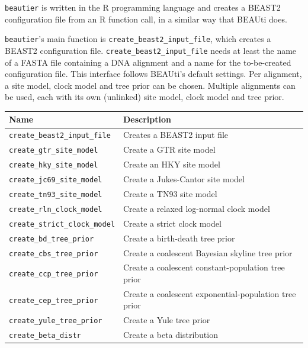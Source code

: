 \documentclass{article}
\begin{document}
\verb;beautier; is written in the R programming language \cite{R}
and creates a BEAST2 configuration file from an R function call,
in a similar way that BEAUti does.

\verb;beautier;'s main function is \verb;create_beast2_input_file;, which creates a BEAST2 configuration file. 
\verb;create_beast2_input_file; needs at least the name of a FASTA file containing a DNA alignment
and a name for the to-be-created configuration file. 
This interface follows BEAUti's default settings.
Per alignment, a site model, clock model and tree prior can be chosen.
Multiple alignments can be used, each with its own (unlinked) site model, clock model and tree prior.

\begin{table}[]
\centering
\begin{tabular}{ | l | l | }
\hline
\textbf{Name} & \textbf{Description} \\
\hline
\verb;create_beast2_input_file; & Creates a BEAST2 input file \\
\hline
\verb;create_gtr_site_model; & Create a GTR site model \cite{tavare1986some} \\
\verb;create_hky_site_model; & Create an HKY site model \cite{hasegawa1985dating} \\
\verb;create_jc69_site_model; & Create a Jukes-Cantor site model \cite{cantor1969mammalian} \\
\verb;create_tn93_site_model; & Create a TN93 site model \cite{tamura1993estimation} \\
\hline
\verb;create_rln_clock_model; & Create a relaxed log-normal clock model \cite{drummond2006relaxed} \\
\verb;create_strict_clock_model; & Create a strict clock model \cite{sarich1967immunological} \\
\hline
\verb;create_bd_tree_prior; & Create a birth-death tree prior \cite{kendall1948generalized} \\
\verb;create_cbs_tree_prior; & Create a coalescent Bayesian skyline tree prior \\
\verb;create_ccp_tree_prior; & Create a coalescent constant-population tree prior \\
\verb;create_cep_tree_prior; & Create a coalescent exponential-population tree prior \\
\verb;create_yule_tree_prior; & Create a Yule tree prior \cite{yule} \\
\hline
\verb;create_beta_distr; & Create a beta distribution \\

\end{tabular}
\end{table}
\end{document}
